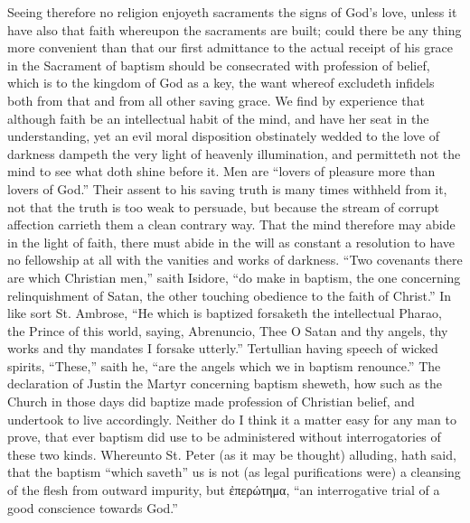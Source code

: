 Seeing therefore no religion enjoyeth sacraments the signs of God’s love, unless it have also that faith whereupon the  sacraments are built; could there be any thing more convenient than that our first admittance to the actual receipt of his grace in the Sacrament of baptism should be consecrated with profession of belief, which is to the kingdom of God as a key, the want whereof excludeth infidels both from that and from all other saving grace.
We find by experience that although faith be an intellectual habit of the mind, and have her seat in the understanding, yet an evil moral disposition obstinately wedded to the love of darkness dampeth the very light of heavenly illumination, and permitteth not the mind to see what doth shine before it. Men are “lovers of pleasure more than lovers of God.” Their assent to his saving truth is many times withheld from it, not that the truth is too weak to persuade, but because the stream of corrupt affection carrieth them a clean contrary way. That the mind therefore may abide in the light of faith, there must abide in the will as constant a resolution to have no fellowship at all with the vanities and works of darkness.
“Two covenants there are which Christian men,” saith Isidore, “do make in baptism, the one concerning relinquishment of Satan, the other touching obedience to the faith of Christ.” In like sort St. Ambrose, “He which is baptized forsaketh the intellectual Pharao, the Prince of this world, saying, Abrenuncio, Thee O Satan and thy angels, thy works and thy mandates I forsake utterly.” Tertullian having speech of wicked spirits, “These,” saith he, “are the angels which we in baptism renounce.” The declaration of Justin the Martyr concerning baptism sheweth,  how such as the Church in those days did baptize made profession of Christian belief, and undertook to live accordingly. Neither do I think it a matter easy for any man to prove, that ever baptism did use to be administered without interrogatories of these two kinds. Whereunto St. Peter (as it may be thought) alluding, hath said, that the baptism “which saveth” us is not (as legal purifications were) a cleansing of the flesh from outward impurity, but ἐπερώτημα, “an interrogative trial of a good conscience towards God.”


